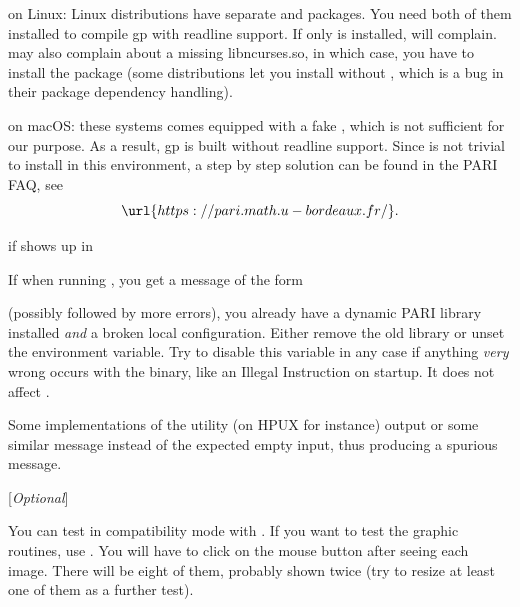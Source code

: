 \item on Linux: Linux distributions have separate  and
 packages. You need both of them installed to
compile gp with readline support. If only  is installed,
 will complain.  may also complain about a
missing libncurses.so, in which case, you have to install the
 package (some distributions let you install
 without , which is a bug in
their package dependency handling).

\item on macOS: these systems comes equipped with a fake ,
which is not sufficient for our purpose. As a result, gp is
built without readline support. Since  is not trivial to
install in this environment, a step by step solution can be found in the PARI
FAQ, see
$$
\url{https://pari.math.u-bordeaux.fr/}.
$$


 if  shows up in 

\item If when running , you get a message of the form


\noindent (possibly followed by more errors), you already have a dynamic PARI
library installed \emph{and} a broken local configuration. Either remove the
old library or unset the  environment variable. Try to
disable this variable in any case if anything \emph{very} wrong occurs with
the  binary, like an Illegal Instruction on startup. It does not
affect .

\item Some implementations of the  utility (on HPUX for
instance) output  or some similar
message instead of the expected empty input, thus producing a spurious
\kbd{[BUG]} message.

 [{\sl Optional\/}]

You can test  in compatibility mode with . If
you want to test the graphic routines, use . You will
have to click on the mouse button after seeing each image. There will be
eight of them, probably shown twice (try to resize at least one of them as a
further test).


